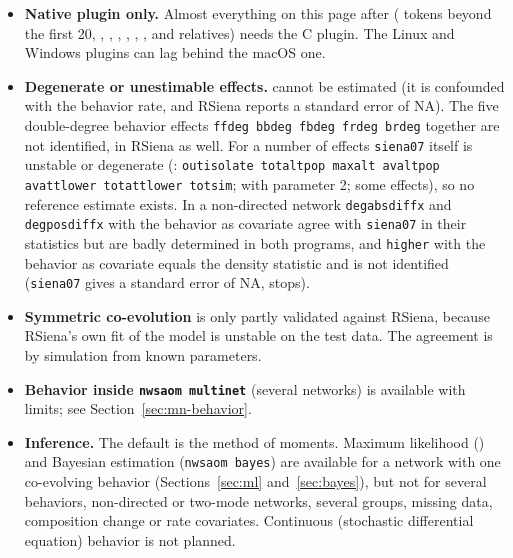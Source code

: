 \begin{itemize}
\item \textbf{Native plugin only.} Almost everything on this page after  ( tokens beyond the first 20, , , , , , ,  and relatives) needs the C plugin. The Linux and Windows plugins can lag behind the macOS one.
\item \textbf{Degenerate or unestimable effects.}  cannot be estimated (it is confounded with the behavior rate, and RSiena reports a standard error of NA). The five double-degree behavior effects \texttt{ffdeg bbdeg fbdeg frdeg brdeg} together are not identified, in RSiena as well. For a number of effects \texttt{siena07} itself is unstable or degenerate (: \texttt{outisolate totaltpop maxalt avaltpop avattlower totattlower totsim};  with parameter 2; some  effects), so no reference estimate exists. In a non-directed network \texttt{degabsdiffx} and \texttt{degposdiffx} with the behavior as covariate agree with \texttt{siena07} in their statistics but are badly determined in both programs, and \texttt{higher} with the behavior as covariate equals the density statistic and is not identified (\texttt{siena07} gives a standard error of NA, \nwsaom{} stops).
\item \textbf{Symmetric co-evolution} is only partly validated against RSiena, because RSiena's own fit of the model is unstable on the test data. The agreement is by simulation from known parameters.
\item \textbf{Behavior inside \texttt{nwsaom multinet}} (several networks) is available with limits; see Section~\ref{sec:mn-behavior}.
\item \textbf{Inference.} The default is the method of moments. Maximum likelihood () and Bayesian estimation (\texttt{nwsaom bayes}) are available for a network with one co-evolving behavior (Sections~\ref{sec:ml} and~\ref{sec:bayes}), but not for several behaviors, non-directed or two-mode networks, several groups, missing data, composition change or rate covariates. Continuous (stochastic differential equation) behavior is not planned.
\end{itemize}
\endgroup
